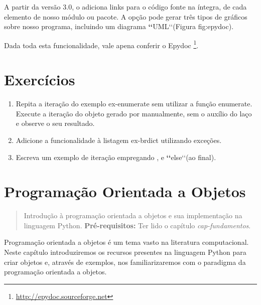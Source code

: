 \documentclass[a4paper,10pt,portuguese]{sphinxmanual}
\begin{document}
A partir da versão 3.0, o  adiciona links para o código
fonte na íntegra, de cada elemento de nosso módulo ou pacote. A
opção  pode gerar três tipos de gráficos sobre nosso
programa, incluindo um diagrama {\color{red}\bfseries{}{}`{}`}UML{}`{}`(Figura fig:epydoc).

Dada toda esta funcionalidade, vale apena conferir o Epydoc \footnote{
\href{http://epydoc.sourceforge.net}{http://epydoc.sourceforge.net}
}.


\chapter{Exercícios}
\label{Cap2:exercicios}\begin{enumerate}
\item {} 
Repita a iteração do exemplo ex-enumerate sem utilizar a função
enumerate. Execute a iteração do objeto gerado por 
manualmente, sem o auxílio do laço  e observe o seu
resultado.

\item {} 
Adicione a funcionalidade  à listagem ex-brdict utilizando
exceções.

\item {} 
Escreva um exemplo de iteração empregando ,  e
{\color{red}\bfseries{}{}`{}`}else{}`{}`(ao final).

\end{enumerate}


\chapter{Programação Orientada a Objetos}
\label{CapObj:cap-obj}\label{CapObj::doc}\label{CapObj:programacao-orientada-a-objetos}\begin{quote}

Introdução à programação orientada a objetos e sua implementação na linguagem Python. \textbf{Pré-requisitos:} Ter lido o capítulo \emph{cap-fundamentos}.
\end{quote}

Programação orientada a objetos é um tema vasto na literatura computacional. Neste capítulo introduziremos os recursos presentes na linguagem Python para criar objetos e, através de exemplos, nos familiarizaremos com o paradigma da programação orientada a objetos.
\end{document}
